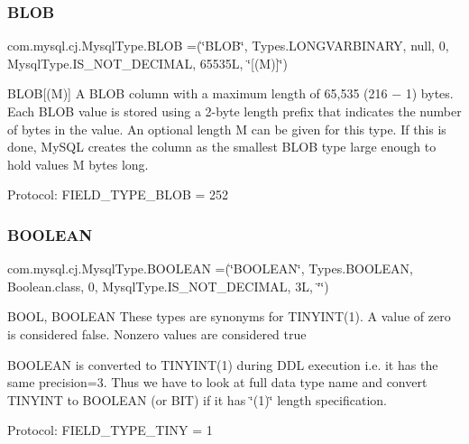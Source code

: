 \subsubsection{\texorpdfstring{B\+L\+OB}{BLOB}}
{\footnotesize\ttfamily com.\+mysql.\+cj.\+Mysql\+Type.\+B\+L\+OB =(\char`\"{}B\+L\+OB\char`\"{}, Types.\+L\+O\+N\+G\+V\+A\+R\+B\+I\+N\+A\+RY, null, 0, Mysql\+Type.\+I\+S\+\_\+\+N\+O\+T\+\_\+\+D\+E\+C\+I\+M\+AL, 65535\+L, \char`\"{}\mbox{[}(\+M)\mbox{]}\char`\"{})}

B\+L\+OB\mbox{[}(M)\mbox{]} A B\+L\+OB column with a maximum length of 65,535 (216 − 1) bytes. Each B\+L\+OB value is stored using a 2-\/byte length prefix that indicates the number of bytes in the value. An optional length M can be given for this type. If this is done, My\+S\+QL creates the column as the smallest B\+L\+OB type large enough to hold values M bytes long.

Protocol\+: F\+I\+E\+L\+D\+\_\+\+T\+Y\+P\+E\+\_\+\+B\+L\+OB = 252 \mbox{\label{enumcom_1_1mysql_1_1cj_1_1_mysql_type_a009ae534b2a4c9a6e60837c1ca1e53b9}} 
\subsubsection{\texorpdfstring{B\+O\+O\+L\+E\+AN}{BOOLEAN}}
{\footnotesize\ttfamily com.\+mysql.\+cj.\+Mysql\+Type.\+B\+O\+O\+L\+E\+AN =(\char`\"{}B\+O\+O\+L\+E\+AN\char`\"{}, Types.\+B\+O\+O\+L\+E\+AN, Boolean.\+class, 0, Mysql\+Type.\+I\+S\+\_\+\+N\+O\+T\+\_\+\+D\+E\+C\+I\+M\+AL, 3\+L, \char`\"{}\char`\"{})}

B\+O\+OL, B\+O\+O\+L\+E\+AN These types are synonyms for T\+I\+N\+Y\+I\+N\+T(1). A value of zero is considered false. Nonzero values are considered true

B\+O\+O\+L\+E\+AN is converted to T\+I\+N\+Y\+I\+N\+T(1) during D\+DL execution i.\+e. it has the same precision=3. Thus we have to look at full data type name and convert T\+I\+N\+Y\+I\+NT to B\+O\+O\+L\+E\+AN (or B\+IT) if it has \char`\"{}(1)\char`\"{} length specification.

Protocol\+: F\+I\+E\+L\+D\+\_\+\+T\+Y\+P\+E\+\_\+\+T\+I\+NY = 1 \mbox{\label{enumcom_1_1mysql_1_1cj_1_1_mysql_type_a7bcb1882ce4e4d44421d877d3f1f64a9}} 

